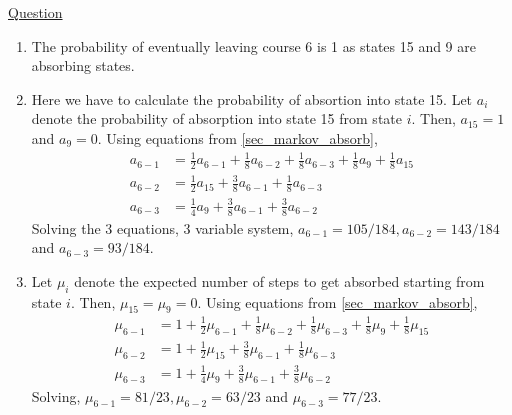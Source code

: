 \documentclass[../probability-notes.tex]{subfiles}
\begin{document}
\begin{enumerate}
        \hypertarget{a_markovcourse}{\item} \hyperlink{q_markovcourse}{Question}\newline
        \begin{enumerate}
            \item The probability of eventually leaving course 6 is 1 as states 15 and 9 are absorbing states.
            \item \label{itm:a_markovcourse_2} Here we have to calculate the probability of absortion into state 15. Let $a_{i}$ denote the probability of absorption into state 15 from state $i$. Then, $a_{15} = 1$ and $a_{9} = 0$. Using equations from \ref{sec_markov_absorb},
            \begin{align*}
                a_{6-1} &= \frac{1}{2}a_{6-1} + \frac{1}{8} a_{6-2} + \frac{1}{8} a_{6-3} + \frac{1}{8}a_{9} + \frac{1}{8}a_{15}\\
                a_{6-2} &= \frac{1}{2}a_{15} + \frac{3}{8}a_{6-1} + \frac{1}{8}a_{6-3}\\
                a_{6-3} &= \frac{1}{4}a_{9} + \frac{3}{8}a_{6-1} + \frac{3}{8}a_{6-2}
            \end{align*}
            Solving the 3 equations, 3 variable system, $a_{6-1} = 105/184, a_{6-2} = 143/184$ and $a_{6-3} = 93/184$.
            \item Let $\mu_{i}$ denote the expected number of steps to get absorbed starting from state $i$. Then, $\mu_{15} = \mu_{9} = 0$. Using equations from \ref{sec_markov_absorb},
            \begin{align*}
                \mu_{6-1} &= 1 + \frac{1}{2}\mu_{6-1} + \frac{1}{8} \mu_{6-2} + \frac{1}{8} \mu_{6-3} + \frac{1}{8}\mu_{9} + \frac{1}{8}\mu_{15}\\
                \mu_{6-2} &= 1 + \frac{1}{2}\mu_{15} + \frac{3}{8}\mu_{6-1} + \frac{1}{8}\mu_{6-3}\\
                \mu_{6-3} &= 1 + \frac{1}{4}\mu_{9} + \frac{3}{8}\mu_{6-1} + \frac{3}{8}\mu_{6-2}                
            \end{align*}
            Solving, $\mu_{6-1} = 81/23, \mu_{6-2} = 63/23$ and $\mu_{6-3} = 77/23$.


\end{enumerate}
\end{enumerate}
\end{document}
